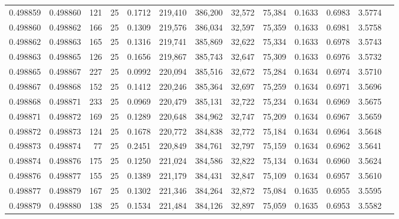 \begin{tabular}{rrrrrrrrrrrrr}
0.498859 & 0.498860 & 121 &  25 &                                     0.1712 & 219,410 & 386,200 &  32,572 &  75,384 & 0.1633 & 0.6983 & 3.5774 \\
0.498860 & 0.498862 & 166 &  25 &                                     0.1309 & 219,576 & 386,034 &  32,597 &  75,359 & 0.1633 & 0.6981 & 3.5758 \\
0.498862 & 0.498863 & 165 &  25 &                                     0.1316 & 219,741 & 385,869 &  32,622 &  75,334 & 0.1633 & 0.6978 & 3.5743 \\
0.498863 & 0.498865 & 126 &  25 &                                     0.1656 & 219,867 & 385,743 &  32,647 &  75,309 & 0.1633 & 0.6976 & 3.5732 \\
0.498865 & 0.498867 & 227 &  25 &                                     0.0992 & 220,094 & 385,516 &  32,672 &  75,284 & 0.1634 & 0.6974 & 3.5710 \\
0.498867 & 0.498868 & 152 &  25 &                                     0.1412 & 220,246 & 385,364 &  32,697 &  75,259 & 0.1634 & 0.6971 & 3.5696 \\
0.498868 & 0.498871 & 233 &  25 &                                     0.0969 & 220,479 & 385,131 &  32,722 &  75,234 & 0.1634 & 0.6969 & 3.5675 \\
0.498871 & 0.498872 & 169 &  25 &                                     0.1289 & 220,648 & 384,962 &  32,747 &  75,209 & 0.1634 & 0.6967 & 3.5659 \\
0.498872 & 0.498873 & 124 &  25 &                                     0.1678 & 220,772 & 384,838 &  32,772 &  75,184 & 0.1634 & 0.6964 & 3.5648 \\
0.498873 & 0.498874 &  77 &  25 &                                     0.2451 & 220,849 & 384,761 &  32,797 &  75,159 & 0.1634 & 0.6962 & 3.5641 \\
0.498874 & 0.498876 & 175 &  25 &                                     0.1250 & 221,024 & 384,586 &  32,822 &  75,134 & 0.1634 & 0.6960 & 3.5624 \\
0.498876 & 0.498877 & 155 &  25 &                                     0.1389 & 221,179 & 384,431 &  32,847 &  75,109 & 0.1634 & 0.6957 & 3.5610 \\
0.498877 & 0.498879 & 167 &  25 &                                     0.1302 & 221,346 & 384,264 &  32,872 &  75,084 & 0.1635 & 0.6955 & 3.5595 \\
0.498879 & 0.498880 & 138 &  25 &                                     0.1534 & 221,484 & 384,126 &  32,897 &  75,059 & 0.1635 & 0.6953 & 3.5582 \\

\end{tabular}
